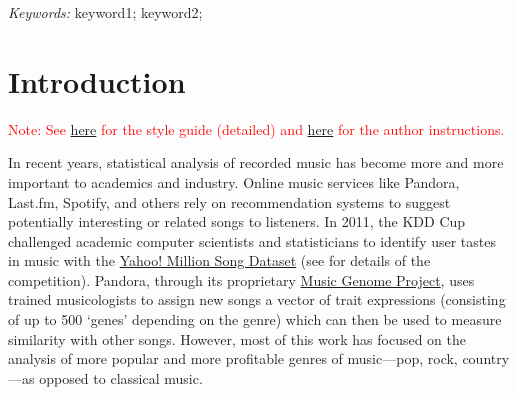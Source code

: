 \documentclass[12pt]{article}
\def\spacingset#1{\renewcommand{\baselinestretch}%
{#1}\small\normalsize} \spacingset{1}
\newcommand{\attn}[1]{\textcolor{red}{Note: #1}}
\begin{document}
\noindent%
{\it Keywords:}  keyword1; keyword2; 
\vfill


\spacingset{1.45} %











\section{Introduction}
\label{sec:introduction}

\attn{See \href {http://amstat.tfjournals.com/asa-style-guide/}{here}
  for the style guide (detailed) and
  \href{https://www.tandfonline.com/action/authorSubmission?journalCode=uasa20&page=instructions}{here}
  for the author instructions.}

In recent years, statistical analysis of recorded music has
become more and more important to academics and industry. Online
music services like Pandora, Last.fm, Spotify, and others rely on
recommendation systems to suggest potentially interesting or related
songs to listeners. In 2011, the KDD Cup challenged academic computer
scientists and statisticians to identify user tastes in music with the
\href{http://labrosa.ee.columbia.edu/millionsong/}{Yahoo! Million
  Song Dataset} (see \citet{DrorKoenigstein2012} for details of the
competition). Pandora, through its proprietary
\href{https://www.pandora.com/about/mgp}{Music Genome Project}, uses
trained musicologists to assign new songs a vector of trait
expressions (consisting of up to 500 `genes' depending on the genre)
which can then be used to measure similarity with other
songs. However, most of this work has focused on the analysis of more popular
and more profitable genres of music---pop, rock, country---as opposed
to classical music. 
\end{document}
